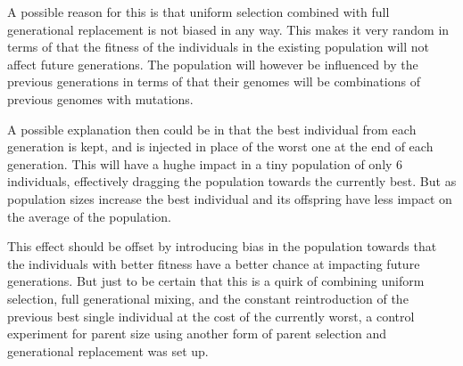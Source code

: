 A possible reason for this is that uniform selection combined with full generational replacement is not biased in any way. This makes it very random in terms of that the fitness of the individuals in the existing population will not affect future generations. The population will however be influenced by the previous generations in terms of that their genomes will be combinations of previous genomes with mutations.

A possible explanation then could be in that the best individual from each generation is kept, and is injected in place of the worst one at the end of each generation. This will have a hughe impact in a tiny population of only 6 individuals, effectively dragging the population towards the currently best. But as population sizes increase the best individual and its offspring have less impact on the average of the population.

This effect should be offset by introducing bias in the population towards that the individuals with better fitness have a better chance at impacting future generations. But just to be certain that this is a quirk of combining uniform selection, full generational mixing, and the constant reintroduction of the previous best single individual at the cost of the currently worst, a control experiment for parent size using another form of parent selection and generational replacement was set up.




